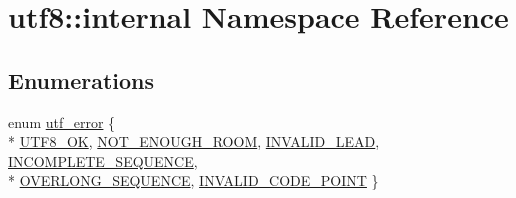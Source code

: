 \hypertarget{namespaceutf8_1_1internal}{}\section{utf8\+:\+:internal Namespace Reference}
\label{namespaceutf8_1_1internal}
\subsection*{Enumerations}
\begin{DoxyCompactItemize}
\item 
enum \hyperlink{namespaceutf8_1_1internal_a9e96c2bc98b37e336b787a281090392c}{utf\+\_\+error} \{ \\*
\hyperlink{namespaceutf8_1_1internal_a9e96c2bc98b37e336b787a281090392cac4d854b29be6992e66c957cf4b957cca}{U\+T\+F8\+\_\+\+O\+K}, 
\hyperlink{namespaceutf8_1_1internal_a9e96c2bc98b37e336b787a281090392ca86ebad67eed937cd0edbd5a9e5867476}{N\+O\+T\+\_\+\+E\+N\+O\+U\+G\+H\+\_\+\+R\+O\+O\+M}, 
\hyperlink{namespaceutf8_1_1internal_a9e96c2bc98b37e336b787a281090392ca316f29394dbc76011590cfe20e8ebc21}{I\+N\+V\+A\+L\+I\+D\+\_\+\+L\+E\+A\+D}, 
\hyperlink{namespaceutf8_1_1internal_a9e96c2bc98b37e336b787a281090392ca0a7c549a77d50c327e177fafc3a8f537}{I\+N\+C\+O\+M\+P\+L\+E\+T\+E\+\_\+\+S\+E\+Q\+U\+E\+N\+C\+E}, 
\\*
\hyperlink{namespaceutf8_1_1internal_a9e96c2bc98b37e336b787a281090392ca74987a94eef8d6936f8d6475e6605373}{O\+V\+E\+R\+L\+O\+N\+G\+\_\+\+S\+E\+Q\+U\+E\+N\+C\+E}, 
\hyperlink{namespaceutf8_1_1internal_a9e96c2bc98b37e336b787a281090392ca8591209ee2d80f2d3728ffb82928c3fa}{I\+N\+V\+A\+L\+I\+D\+\_\+\+C\+O\+D\+E\+\_\+\+P\+O\+I\+N\+T}
 \}
\end{DoxyCompactItemize}

